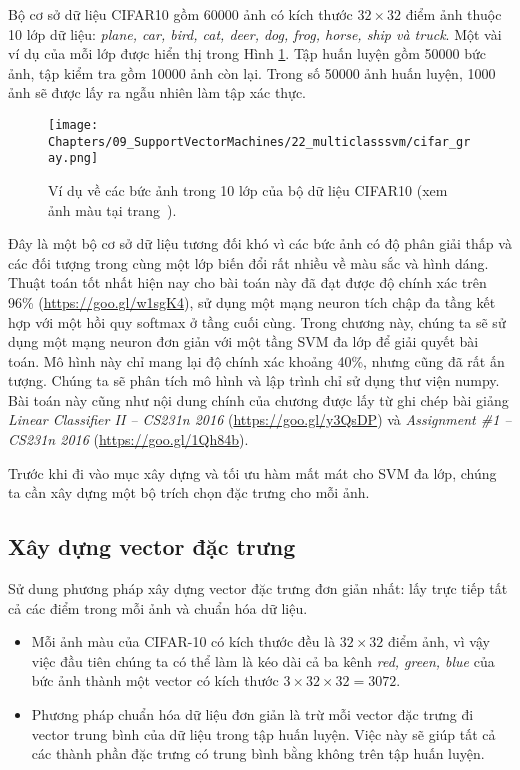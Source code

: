 Bộ cơ sở dữ liệu CIFAR10 gồm 60000 ảnh có kích thước $32 \times 32$ điểm ảnh
thuộc 10 lớp dữ liệu: \textit{plane, car, bird, cat, deer, dog, frog, horse,
ship và truck}. Một vài ví dụ của mỗi lớp được hiển thị trong Hình \ref{fig:22_2}.
Tập huấn luyện gồm 50000 bức ảnh, tập kiểm tra gồm 10000 ảnh còn lại.
Trong số 50000 ảnh huấn luyện, 1000 ảnh sẽ được lấy ra ngẫu nhiên làm tập xác
thực.
\begin{figure}[t]
\centering
\texttt{[image: Chapters/09\_SupportVectorMachines/22\_multiclasssvm/cifar\_gray.png]}
\caption[]{Ví dụ về các bức ảnh trong 10 lớp của bộ dữ liệu CIFAR10 (xem ảnh màu tại trang~\pageref{fig:22_2_c}).}
\label{fig:22_2}
\end{figure}
Đây là một bộ cơ sở dữ liệu tương đối khó vì các bức ảnh có độ phân giải thấp và
các đối tượng trong cùng một lớp biến đổi rất nhiều về màu sắc và hình dáng.
Thuật toán tốt nhất hiện nay cho bài toán này đã đạt được độ chính xác trên 96\%
(\url{https://goo.gl/w1sgK4}), sử dụng một mạng neuron tích chập đa tầng kết hợp
với một hồi quy softmax ở tầng cuối cùng. Trong chương này, chúng ta sẽ sử dụng
một mạng neuron đơn giản với một tầng SVM đa lớp để giải quyết bài toán. Mô hình
này chỉ mang lại độ chính xác khoảng 40\%, nhưng cũng đã rất ấn tượng. Chúng ta
sẽ phân tích mô hình và lập trình chỉ sử dụng thư viện numpy. Bài toán này cũng
như nội dung chính của chương được lấy từ ghi chép bài giảng \textit{Linear
Classifier II  --  CS231n 2016} (\url{https://goo.gl/y3QsDP}) và
\textit{Assignment \#1  --  CS231n 2016} (\url{https://goo.gl/1Qh84b}).

Trước khi đi vào mục xây dựng và tối ưu hàm mất mát cho SVM đa lớp, chúng ta cần xây dựng một bộ trích chọn đặc trưng cho mỗi ảnh.

\subsection{Xây dựng vector đặc trưng}
Sử dung phương pháp xây dựng vector đặc trưng đơn giản nhất: lấy
trực tiếp tất cả các điểm trong mỗi ảnh và chuẩn hóa dữ liệu.
\begin{itemize}
\item Mỗi ảnh {màu} của CIFAR-10 có kích thước đều là $32
\times 32$ điểm ảnh, vì vậy việc đầu tiên chúng ta có thể làm là {kéo dài} cả ba kênh \textit{red, green, blue} của bức ảnh thành một vector có kích thước $3 \times 32 \times 32 = 3072$.

\item Phương pháp chuẩn hóa dữ liệu đơn giản là trừ mỗi vector đặc trưng đi vector trung bình của dữ liệu trong tập huấn luyện. Việc này sẽ giúp tất cả các thành phần đặc trưng có trung bình bằng không trên tập huấn luyện.

\end{itemize}

